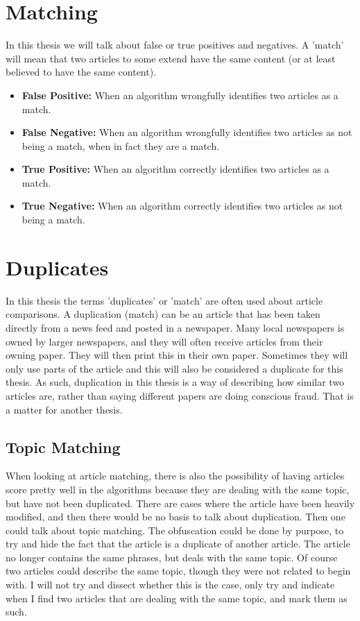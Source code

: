 \section{Matching}
In this thesis we will talk about false or true positives and negatives. A 'match' will mean that two articles to some extend have the same content (or at least believed to have the same content).

\begin{itemize}
\item \textbf{False Positive:} When an algorithm wrongfully identifies two articles as a match.
\item \textbf{False Negative:} When an algorithm wrongfully identifies two articles as not being a match, when in fact they are a match.
\item \textbf{True Positive:} When an algorithm correctly identifies two articles as a match.
\item \textbf{True Negative:} When an algorithm correctly identifies two articles as not being a match.
\end{itemize}


\section{Duplicates}
In this thesis the terms 'duplicates' or 'match' are often used about article comparisons. A duplication (match) can be an article that has been taken directly from a news feed and posted in a newspaper. Many local newspapers is owned by larger newspapers, and they will often receive articles from their owning paper. They will then print this in their own paper. Sometimes they will only use parts of the article and this will also be considered a duplicate for this thesis. As such, duplication in this thesis is a way of describing how similar two articles are, rather than saying different papers are doing conscious fraud. That is a matter for another thesis. 

\subsection{Topic Matching}
When looking at article matching, there is also the possibility of having articles score pretty well in the algorithms because they are dealing with the same topic, but have not been duplicated. There are cases where the article have been heavily modified, and then there would be no basis to talk about duplication. Then one could talk about topic matching. The obfuscation could be done by purpose, to try and hide the fact that the article is a duplicate of another article. The article no longer contains the same phrases, but deals with the same topic.
Of course two articles could describe the same topic, though they were not related to begin with. I will not try and dissect whether this is the case, only try and indicate when I find two articles that are dealing with the same topic, and mark them as such. 


